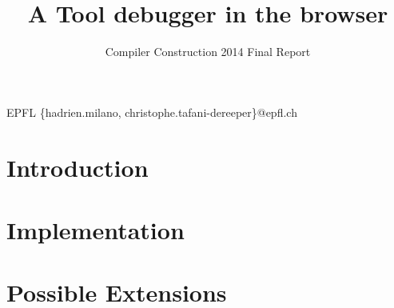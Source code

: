 \documentclass[nocopyrightspace,11pt,authoryear,preprint]{sigplanconf}
\begin{document}


\title{A Tool debugger in the browser}
\subtitle{Compiler Construction 2014 Final Report}

           {EPFL}
           {\{hadrien.milano, christophe.tafani-dereeper\}@epfl.ch}

\maketitle

\section{Introduction}


%

\section{Implementation}


\section{Possible Extensions}




\end{document}
